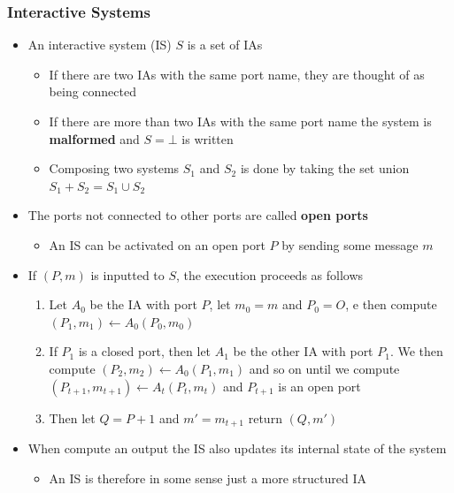 \documentclass[11pt]{article}
\begin{document}
\subsubsection{Interactive Systems}
\label{sec:org49229be}
\begin{itemize}
\item An interactive system (IS) \(S\) is a set of IAs
\begin{itemize}
\item If there are two IAs with the same port name, they are thought of as being connected
\item If there are more than two IAs with the same port name the system is \textbf{malformed} and \(S = \bot\) is written
\item Composing two systems \(S_1\) and \(S_2\) is done by taking the set union \(S_1+S_2 = S_1 \cup S_2\)
\end{itemize}

\item The ports not connected to other ports are called \textbf{open ports}
\begin{itemize}
\item An IS can be activated on an open port \(P\) by sending some message \(m\)
\end{itemize}

\item If \((P,m)\) is inputted to \(S\), the execution proceeds as follows
\begin{enumerate}
\item Let \(A_0\) be the IA with port \(P\), let \(m_0 = m\) and \(P_0 = O\), e then compute \((P_1, m_1) \leftarrow A_0(P_0, m_0)\)
\item If \(P_1\) is a closed port, then let \(A_1\) be the other IA with port \(P_1\). We then compute \((P_2, m_2) \leftarrow A_0(P_1, m_1)\) and so on until we compute \((P_{t+1}, m_{t+1}) \leftarrow A_t(P_t, m_t)\) and \(P_{t+1}\) is an open port
\item Then let \(Q = P+1\) and \(m' = m_{t+1}\) return \((Q, m')\)
\end{enumerate}

\item When compute an output the IS also updates its internal state of the system
\begin{itemize}
\item An IS is therefore in some sense just a more structured IA
\end{itemize}
\end{itemize}
\end{document}
